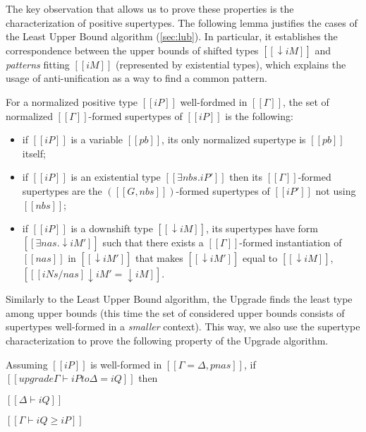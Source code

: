     The key observation that allows us to prove these properties is
    the characterization of positive supertypes. 
    The following lemma justifies the cases of the Least Upper Bound algorithm
    (\cref{sec:lub}). In particular, it establishes
    the correspondence between the upper bounds of shifted types $[[↓iM]]$ and
    \emph{patterns} fitting $[[iM]]$ (represented by existential types), which 
    explains the usage of anti-unification as a way to find a common pattern. 

    \begin{lemma*}
        \label{lemma:char-supertypes}
        For a normalized positive type $[[iP]]$ well-fordmed in $[[Γ]]$,
        the set of normalized $[[Γ]]$-formed supertypes of $[[iP]]$ is the following:
        \begin{itemize}
            \item if $[[iP]]$ is a variable $[[pb]]$, its only normalized supertype is $[[pb]]$ itself;
            \item if $[[iP]]$ is an existential type $[[ ∃nbs.iP' ]]$ then 
                its $[[Γ]]$-formed supertypes are the $([[G, nbs]])$-formed supertypes of $[[iP']]$ not using $[[nbs]]$;
            \item if $[[iP]]$ is a downshift type $[[↓iM]]$, 
                its supertypes have form $[[∃nas.↓iM']]$ such that there exists
                a $[[Γ]]$-formed instantiation of $[[nas]]$ in $[[↓iM']]$
                that makes $[[↓iM']]$ equal to $[[↓iM]]$, \ie $[[ [iNs/nas] ↓iM' = ↓iM ]]$.
        \end{itemize}
    \end{lemma*}

    Similarly to the Least Upper Bound algorithm, the Upgrade finds the least type among upper bounds
    (this time the set of considered upper bounds consists of supertypes well-formed in a \emph{smaller} context).
    This way, we also use the supertype characterization to prove the following property of the Upgrade algorithm. 

    \begin{lemma*}
        Assuming $[[iP]]$ is well-formed in $[[Γ = Δ, pnas]]$,
        if $[[upgrade Γ ⊢ iP to Δ = iQ]]$
        then
        \begin{enumerate*}
            \item $[[Δ ⊢ iQ]]$
            \item $[[Γ ⊢ iQ ≥ iP]]$
        \end{enumerate*}
    \end{lemma*}

